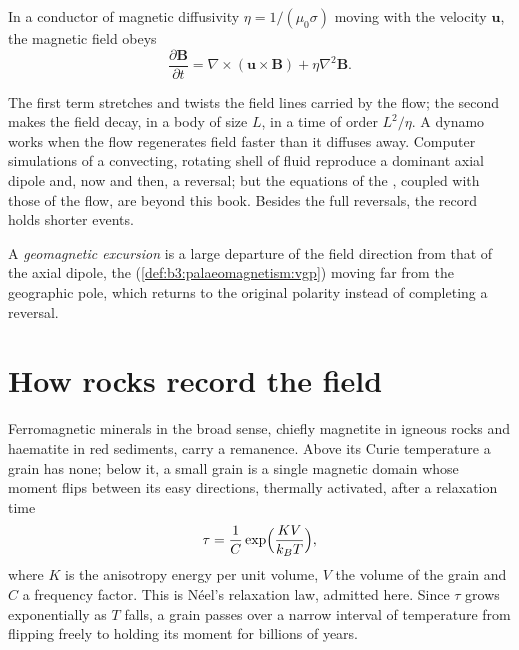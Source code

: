 \begin{proposition}\label{prop:b3:palaeomagnetism:induction}
In a conductor of magnetic diffusivity $\eta = 1/(\mu_0\sigma)$ moving with the
velocity $\mathbf u$, the magnetic field obeys
\[
  \frac{\partial\mathbf B}{\partial t} = \nabla\times(\mathbf u\times\mathbf B)
  + \eta\nabla^2\mathbf B .
\]
\end{proposition}
\admitted

The first term stretches and twists the field lines carried by the flow; the
second makes the field decay, in a body of size $L$, in a time of order
$L^2/\eta$. A dynamo works when the flow regenerates field faster than it
diffuses away. Computer simulations of a convecting, rotating shell of fluid
reproduce a dominant axial dipole and, now and then, a reversal; but the
equations of the , coupled with those of the flow, are beyond this
book. Besides the full reversals, the record holds shorter events.

\begin{definition}\label{def:b3:palaeomagnetism:excursion}
A \emph{geomagnetic excursion} is a large
departure of the field direction from that of the axial dipole, the
 (\cref{def:b3:palaeomagnetism:vgp}) moving far from
the geographic pole, which returns to the original polarity instead of
completing a reversal.
\end{definition}

\section{How rocks record the field}

Ferromagnetic minerals in the broad sense, chiefly magnetite in igneous rocks
and haematite in red sediments, carry a remanence. Above its Curie temperature
a grain has none; below it, a small grain is a single magnetic domain whose
moment flips between its easy directions, thermally activated, after a
relaxation time
\[
  \tau = \frac1C\exp\Bigl(\frac{K V}{k_B T}\Bigr),
\]
where $K$ is the anisotropy energy per unit volume, $V$ the volume of the grain
and $C$ a frequency factor. This is Néel's relaxation law, admitted here. Since
$\tau$ grows exponentially as $T$ falls, a grain passes over a narrow interval
of temperature from flipping freely to holding its moment for billions of
years.

